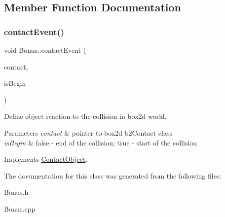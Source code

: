 \subsection{Member Function Documentation}
\mbox{\label{class_bonus_a903865168ff7fd91e0e2de23f849c553}} 
\subsubsection{\texorpdfstring{contact\+Event()}{contactEvent()}}
{\footnotesize\ttfamily void Bonus\+::contact\+Event (\begin{DoxyParamCaption}\item[{b2\+Contact $\ast$}]{contact,  }\item[{bool}]{is\+Begin }\end{DoxyParamCaption})\hspace{0.3cm}{\ttfamily [virtual]}}



Define object reaction to the collision in box2d world. 


\begin{DoxyParams}{Parameters}
{\em contact} & pointer to box2d b2\+Contact class \\
\hline
{\em is\+Begin} & \textquotesingle{}false\textquotesingle{} -\/ end of the collision; \textquotesingle{}true\textquotesingle{} -\/ start of the collision \\
\hline
\end{DoxyParams}


Implements \hyperlink{class_contact_object_a53d2dfc1d9c2821e9c62e80ce62a6435}{Contact\+Object}.



The documentation for this class was generated from the following files\+:\begin{DoxyCompactItemize}
\item 
Bonus.\+h\item 
Bonus.\+cpp\end{DoxyCompactItemize}
